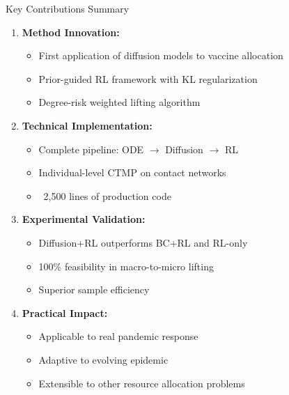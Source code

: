 \documentclass[aspectratio=169]{beamer}
\begin{document}
\begin{frame}{Key Contributions Summary}

\begin{enumerate}
    \item \textbf{Method Innovation:}
    \begin{itemize}
        \item First application of diffusion models to vaccine allocation
        \item Prior-guided RL framework with KL regularization
        \item Degree-risk weighted lifting algorithm
    \end{itemize}

    \item \textbf{Technical Implementation:}
    \begin{itemize}
        \item Complete pipeline: ODE $\to$ Diffusion $\to$ RL
        \item Individual-level CTMP on contact networks
        \item ~2,500 lines of production code
    \end{itemize}

    \item \textbf{Experimental Validation:}
    \begin{itemize}
        \item Diffusion+RL outperforms BC+RL and RL-only
        \item 100\% feasibility in macro-to-micro lifting
        \item Superior sample efficiency
    \end{itemize}

    \item \textbf{Practical Impact:}
    \begin{itemize}
        \item Applicable to real pandemic response
        \item Adaptive to evolving epidemic
        \item Extensible to other resource allocation problems
    \end{itemize}
\end{enumerate}

\end{frame}
\end{document}
